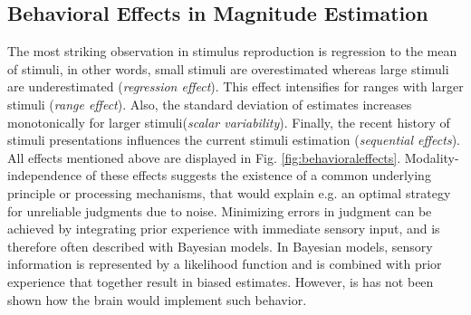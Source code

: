 \documentclass[10pt]{article}
\begin{document}






\subsection{Behavioral Effects in Magnitude Estimation}
The most striking observation in stimulus reproduction is regression to the mean of stimuli, in other words, small stimuli are overestimated whereas large stimuli are underestimated (\textit{regression effect}). 
This effect intensifies for ranges with larger stimuli (\textit{range effect}).
Also, the standard deviation of estimates increases monotonically for larger stimuli(\textit{scalar variability}). 
Finally, the recent history of stimuli presentations influences the current stimuli estimation (\textit{sequential effects}).
All effects mentioned above are displayed in Fig. \ref{fig:behavioraleffects}. 
Modality-independence of these effects suggests the existence of a common underlying principle or processing mechanisms, that would explain e.g. an optimal strategy for unreliable judgments due to noise.
Minimizing errors in judgment can be achieved by integrating prior experience with immediate sensory input, and is therefore often described with Bayesian models.
In Bayesian models, sensory information is represented by a likelihood function and is combined with prior experience that together result in biased estimates.
However, is has not been shown how the brain would implement such behavior. 
\end{document}
